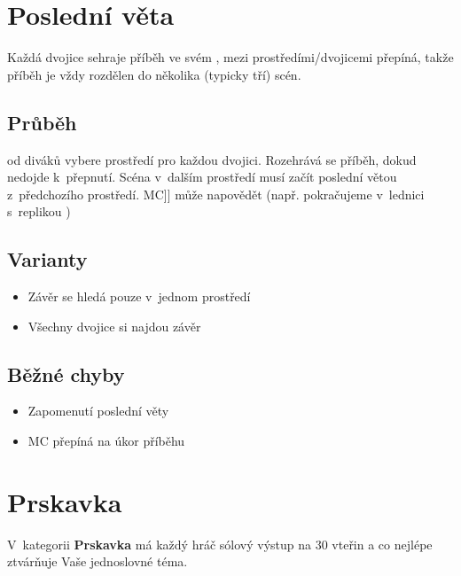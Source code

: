  
 
 
 
\needspace{5cm} \section{Poslední věta} \label{poslední věta}  
 
Každá dvojice sehraje příběh ve svém ,  mezi prostředími/dvojicemi přepíná, takže příběh je vždy rozdělen do několika (typicky tří) scén. 
 
\subsection{Průběh}  od diváků vybere prostředí pro každou dvojici. Rozehrává se  příběh, dokud nedojde k~přepnutí. 
Scéna v~dalším prostředí  musí začít  poslední větou z~předchozího prostředí. 
MC]] může napovědět (např. pokračujeme v~lednici s~replikou  ) 
 
\subsection{ Varianty } \begin{itemize}
\item Závěr se hledá pouze v~jednom prostředí
\item Všechny dvojice si najdou závěr
\end{itemize}
 
\subsection{ Běžné chyby } \begin{itemize}
\item Zapomenutí poslední věty
\item MC přepíná na úkor příběhu
\end{itemize}
 
 
 
 
 
\needspace{5cm} \section{Prskavka} \label{prskavka}  
V~kategorii \textbf{Prskavka} má každý hráč sólový výstup na 30 vteřin a co nejlépe ztvárňuje Vaše jednoslovné téma. 
 
